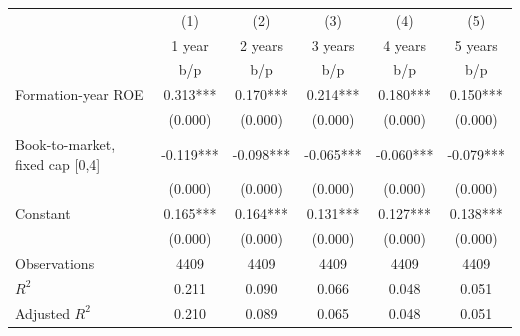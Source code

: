 {
\def\sym#1{\ifmmode^{#1}\else\(^{#1}\)\fi}
\begin{tabular}{l*{5}{c}}
\hline\hline
                    &\multicolumn{1}{c}{(1)}&\multicolumn{1}{c}{(2)}&\multicolumn{1}{c}{(3)}&\multicolumn{1}{c}{(4)}&\multicolumn{1}{c}{(5)}\\
                    &\multicolumn{1}{c}{1 year}&\multicolumn{1}{c}{2 years}&\multicolumn{1}{c}{3 years}&\multicolumn{1}{c}{4 years}&\multicolumn{1}{c}{5 years}\\
                    &         b/p   &         b/p   &         b/p   &         b/p   &         b/p   \\
\hline
Formation-year ROE  &       0.313***&       0.170***&       0.214***&       0.180***&       0.150***\\
                    &     (0.000)   &     (0.000)   &     (0.000)   &     (0.000)   &     (0.000)   \\
Book-to-market, fixed cap [0,4]&      -0.119***&      -0.098***&      -0.065***&      -0.060***&      -0.079***\\
                    &     (0.000)   &     (0.000)   &     (0.000)   &     (0.000)   &     (0.000)   \\
Constant            &       0.165***&       0.164***&       0.131***&       0.127***&       0.138***\\
                    &     (0.000)   &     (0.000)   &     (0.000)   &     (0.000)   &     (0.000)   \\
\hline
Observations        &        4409   &        4409   &        4409   &        4409   &        4409   \\
\(R^{2}\)           &       0.211   &       0.090   &       0.066   &       0.048   &       0.051   \\
Adjusted \(R^{2}\)  &       0.210   &       0.089   &       0.065   &       0.048   &       0.051   \\
\hline\hline
\end{tabular}
}
